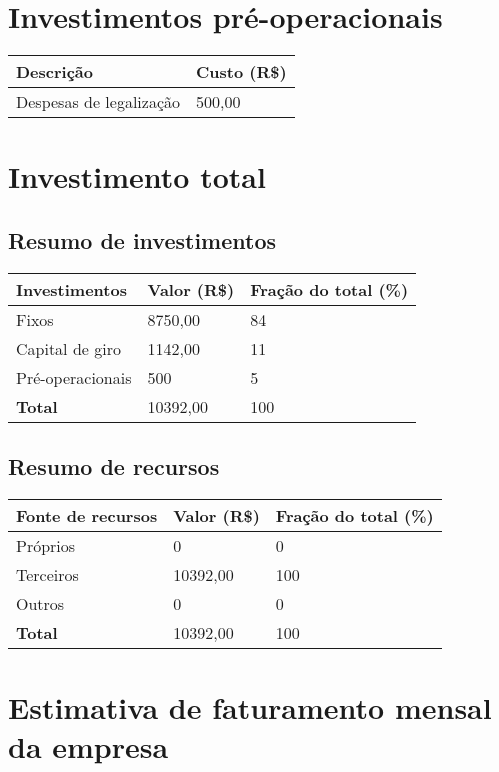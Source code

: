 \section{Investimentos pré-operacionais}

\begin{tabular}{| l | l |}
  \hline
  \textbf{Descrição} & \textbf{Custo (R\$)}\\ \hline
  Despesas de legalização & 500,00\\ \hline        
\end{tabular}
  
\section{Investimento total}

  \subsection{Resumo de investimentos}
  
  \begin{tabular}{| l | l | l |}
    \hline
    \textbf{Investimentos} & \textbf{Valor (R\$)} & \textbf{Fração do total} (\%)\\ \hline
    Fixos & 8750,00 & 84\\ \hline
    Capital de giro & 1142,00 & 11\\ \hline
    Pré-operacionais & 500 & 5\\ \hline
    \textbf{Total} & 10392,00 & 100\\ \hline
  \end{tabular}
  
  \subsection{Resumo de recursos}
  
  \begin{tabular}{| l | l | l |}
    \hline
    \textbf{Fonte de recursos} & \textbf{Valor (R\$)} & \textbf{Fração do total} (\%)\\ \hline
    Próprios & 0 & 0\\ \hline
    Terceiros & 10392,00 & 100\\ \hline
    Outros & 0 & 0\\ \hline
    \textbf{Total} & 10392,00 & 100\\ \hline
  \end{tabular}
  
\section{Estimativa de faturamento mensal da empresa}\label{sec:faturamento}

